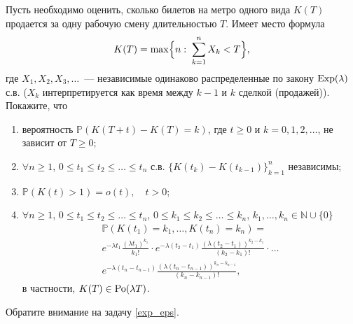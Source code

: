 


\begin{problem}
\label{sec:poisson}
Пусть необходимо оценить, сколько билетов на метро одного вида $K(T)$ 
продается за одну рабочую смену длительностью $T$. Имеет место формула 
$$
K(T)=\max\Bigl\{ n:\; \sum\limits_{k=1}^{n} X_k<T \Bigr\} , 
$$
где $X_1, X_2, X_3,\ldots$~--- независимые одинаково распределенные по закону ${\rm Exp}(\lambda)$ с.в. ($X_k$ интерпретируется как время между 
$k-1$ и $k$ сделкой (продажей)). Покажите, что 
\begin{enumerate}
\item вероятность ${\mathbb P}(K(T+t)-K(T)=k)$, где $t\geqslant 0$ и $k=0,1,2,\ldots$, не зависит от $T\geqslant 0$; 

\item $\forall n\geqslant 1$, $0\leqslant t_1\leqslant t_2\leqslant \ldots\leqslant t_n$ 
 с.в. $\bigl\{ K(t_k)-K(t_{k-1})\bigr\}_{k=1}^{n}$ независимы; 

\item ${\mathbb P}(K(t)>1)=o(t),\quad t>0$; 

\item $\forall n\geqslant 1$, $0\leqslant t_1\leqslant t_2\leqslant \ldots\leqslant t_n$, 
$0\leqslant k_1\leqslant k_2\leqslant \ldots\leqslant k_n$, $k_1,\ldots, k_n\in {\mathbb N}\cup \{ 0\}$ 
\begin{multline*}
{\mathbb P}(K(t_1) = k_1,\ldots, K(t_n)=k_n)= \\
e^{-\lambda t_1} \frac{(\lambda t_1)^{k_1}}{k_1!}\cdot 
e^{-\lambda(t_2-t_1)} \frac{(\lambda(t_2-t_1))^{k_2-k_1}}{(k_2-k_1)!}\cdot \ldots \\
e^{-\lambda(t_n-t_{n-1})}\frac{(\lambda(t_n-t_{n-1}))^{k_n-k_{n-1}}}{(k_n-k_{n-1})!} , 
\end{multline*}
в частности, $K(T)\in \mathrm{Po}(\lambda T)$. 

\end{enumerate}
\end{problem}
\begin{remark}
Обратите внимание на задачу \ref{exp_eps}.
\end{remark}



